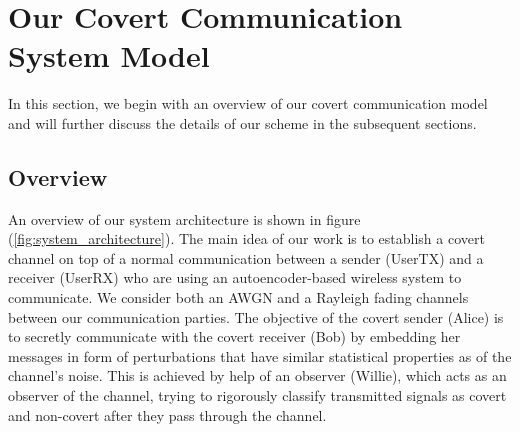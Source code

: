 \section{Our Covert Communication System Model}
\label{s:model}
In this section, we begin with an overview of our covert communication model and will further discuss the details of our scheme in the subsequent sections.
\subsection{Overview}
An overview of our system architecture is shown in figure (\ref{fig:system_architecture}). The main idea of our work is to establish a covert channel on top of a normal communication between a sender (UserTX) and a receiver (UserRX) who are using an autoencoder-based wireless system to communicate. We consider both an AWGN and a Rayleigh fading channels between our communication parties. The objective of the covert sender (Alice) is to secretly communicate with the covert receiver (Bob) by embedding her messages in form of perturbations that have similar statistical properties as of the channel's noise. This is achieved by help of an observer (Willie), which acts as an observer of the channel, trying to rigorously classify transmitted signals as covert and non-covert after they pass through the channel.\\
